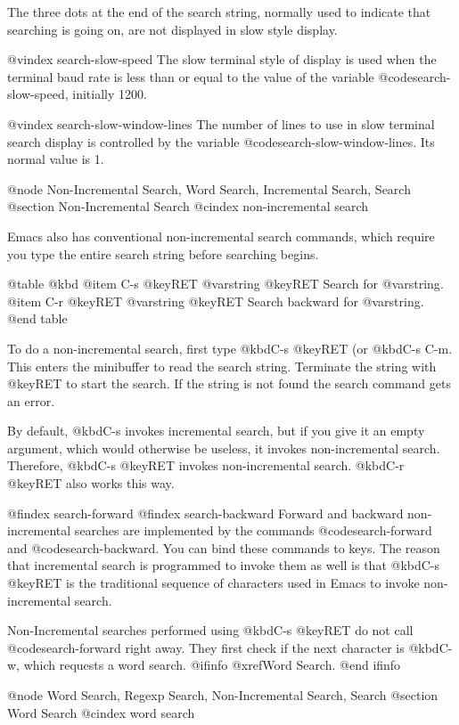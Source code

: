 {{{{  The three dots at the end of the search string, normally used to indicate
that searching is going on, are not displayed in slow style display.

@vindex search-slow-speed
  The slow terminal style of display is used when the terminal baud rate is
less than or equal to the value of the variable @code{search-slow-speed},
initially 1200.

@vindex search-slow-window-lines
  The number of lines to use in slow terminal search display is controlled
by the variable @code{search-slow-window-lines}.  Its normal value is 1.

@node Non-Incremental Search, Word Search, Incremental Search, Search
@section Non-Incremental Search
@cindex non-incremental search

  Emacs also has conventional non-incremental search commands, which require
you type the entire search string before searching begins.

@table @kbd
@item C-s @key{RET} @var{string} @key{RET}
Search for @var{string}.
@item C-r @key{RET} @var{string} @key{RET}
Search backward for @var{string}.
@end table

  To do a non-incremental search, first type @kbd{C-s @key{RET}}
(or @kbd{C-s C-m}.  This enters the minibuffer to read the search string.
Terminate the string with @key{RET} to start the search.  If the string
is not found the search command gets an error.

 By default, @kbd{C-s} invokes incremental search, but if you give it an
empty argument, which would otherwise be useless, it invokes non-incremental
search.  Therefore, @kbd{C-s @key{RET}} invokes non-incremental search. 
@kbd{C-r @key{RET}} also works this way.

@findex search-forward
@findex search-backward
  Forward and backward non-incremental searches are implemented by the
commands @code{search-forward} and @code{search-backward}.  You can bind
these commands to keys.  The reason that incremental
search is programmed to invoke them as well is that @kbd{C-s @key{RET}}
is the traditional sequence of characters used in Emacs to invoke
non-incremental search.

 Non-Incremental searches performed using @kbd{C-s @key{RET}} do
not call @code{search-forward} right away.  They first check
if the next character is @kbd{C-w}, which requests a word search.
@ifinfo
@xref{Word Search}.
@end ifinfo

@node Word Search, Regexp Search, Non-Incremental Search, Search
@section Word Search
@cindex word search

}}}}
